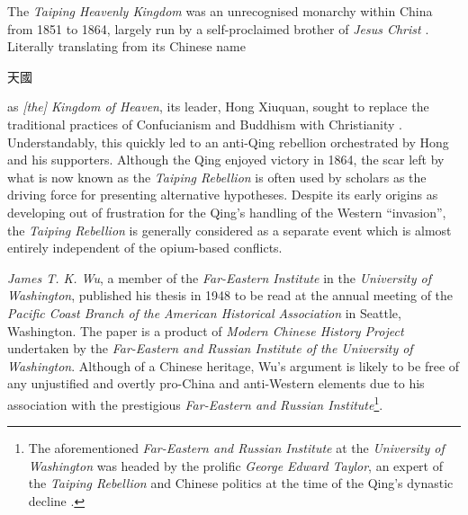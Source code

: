 \documentclass{article}
\newcommand{\zht}[1]{%
        \begin{CJK*}{UTF8}{bsmi}%
                \normalfont%
                #1
        \end{CJK*}
}
\begin{document}
        The \textit{Taiping Heavenly Kingdom} was an unrecognised monarchy within China from 1851 to 1864, largely run by a self-proclaimed brother of \textit{Jesus Christ} \autocites{Reilly:2014}{Yap:1954}. Literally translating from its Chinese name \zht{天國} as \textit{[the] Kingdom of Heaven}, its leader, Hong Xiuquan, sought to replace the traditional practices of Confucianism and Buddhism with Christianity \autocite{Spence:1996}. Understandably, this quickly led to an anti-Qing rebellion orchestrated by Hong and his supporters. Although the Qing enjoyed victory in 1864, the scar left by what is now known as the \textit{Taiping Rebellion} is often used by scholars as the driving force for presenting alternative hypotheses. Despite its early origins as developing out of frustration for the Qing's handling of the Western ``invasion'', the \textit{Taiping Rebellion} is generally considered as a separate event which is almost entirely independent of the opium-based conflicts.

        

        \textit{James T. K. Wu}, a member of the \textit{Far-Eastern Institute} in the \textit{University of Washington}, published his thesis in 1948 to be read at the annual meeting of the \textit{Pacific Coast Branch of the American Historical Association} in Seattle, Washington. The paper is a product of \textit{Modern Chinese History Project} undertaken by the \textit{Far-Eastern and Russian Institute of the University of Washington}. Although of a Chinese heritage, Wu's argument is likely to be free of any unjustified and overtly pro-China and anti-Western elements due to his association with the prestigious \textit{Far-Eastern and Russian Institute}\footnote{The aforementioned \textit{Far-Eastern and Russian Institute} at the \textit{University of Washington} was headed by the prolific \textit{George Edward Taylor}, an expert of the \textit{Taiping Rebellion} and Chinese politics at the time of the Qing's dynastic decline \autocite{Taylor:1999}.}.
\end{document}
